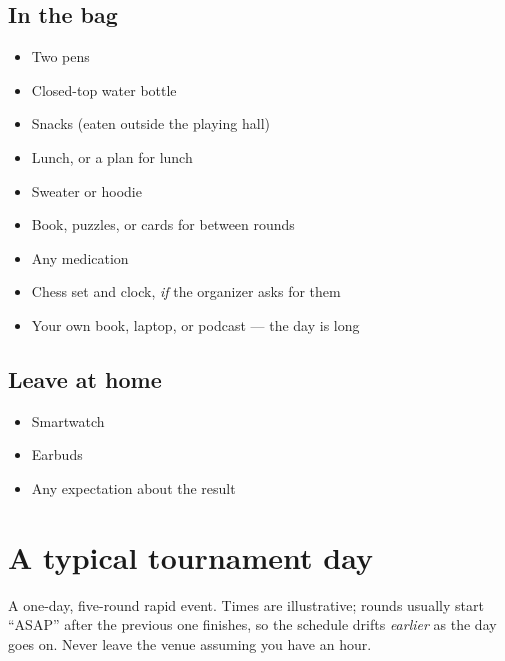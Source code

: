 \documentclass[10pt,letterpaper]{article}
\begin{document}
\subsection*{In the bag}
\begin{itemize}
  \item[$\square$] Two pens
  \item[$\square$] Closed-top water bottle
  \item[$\square$] Snacks (eaten outside the playing hall)
  \item[$\square$] Lunch, or a plan for lunch
  \item[$\square$] Sweater or hoodie
  \item[$\square$] Book, puzzles, or cards for between rounds
  \item[$\square$] Any medication
  \item[$\square$] Chess set and clock, \emph{if} the organizer asks for them
  \item[$\square$] Your own book, laptop, or podcast --- the day is long
\end{itemize}

\subsection*{Leave at home}
\begin{itemize}
  \item[$\square$] Smartwatch
  \item[$\square$] Earbuds
  \item[$\square$] Any expectation about the result
\end{itemize}

\section{A typical tournament day}

A one-day, five-round rapid event. Times are illustrative; rounds usually start
``ASAP'' after the previous one finishes, so the schedule drifts \emph{earlier}
as the day goes on. Never leave the venue assuming you have an hour.
\end{document}

